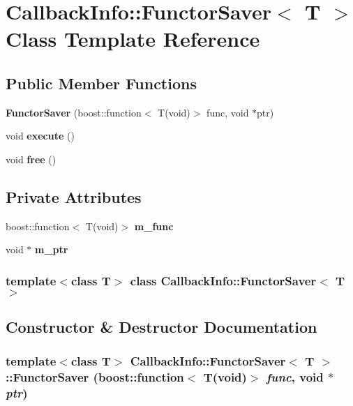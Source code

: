 \section{Callback\-Info::Functor\-Saver$<$ T $>$ Class Template Reference}
\label{class_callback_info_1_1_functor_saver}
\subsection*{Public Member Functions}
\begin{CompactItemize}
\item 
{\bf Functor\-Saver} (boost::function$<$ T(void)$>$ func, void $\ast$ptr)
\item 
void {\bf execute} ()
\item 
void {\bf free} ()
\end{CompactItemize}
\subsection*{Private Attributes}
\begin{CompactItemize}
\item 
boost::function$<$ T(void)$>$ {\bf m\_\-func}
\item 
void $\ast$ {\bf m\_\-ptr}
\end{CompactItemize}
\subsubsection*{template$<$class T$>$ class Callback\-Info::Functor\-Saver$<$ T $>$}



\subsection{Constructor \& Destructor Documentation}
\subsubsection{\setlength{\rightskip}{0pt plus 5cm}template$<$class T$>$ {\bf Callback\-Info::Functor\-Saver}$<$ T $>$::{\bf Functor\-Saver} (boost::function$<$ T(void)$>$ {\em func}, void $\ast$ {\em ptr})\hspace{0.3cm}{\tt  [inline]}}\label{class_callback_info_1_1_functor_saver_fd3fbf67dac86f8343c61223ec4151a1}




